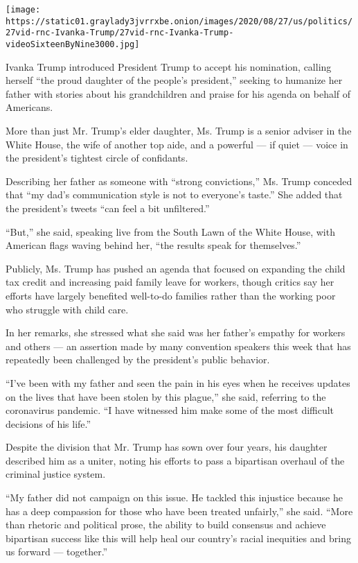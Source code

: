 \texttt{[image: https://static01.graylady3jvrrxbe.onion/images/2020/08/27/us/politics/27vid-rnc-Ivanka-Trump/27vid-rnc-Ivanka-Trump-videoSixteenByNine3000.jpg]}

Ivanka Trump introduced President Trump to accept his nomination,
calling herself ``the proud daughter of the people's president,''
seeking to humanize her father with stories about his grandchildren and
praise for his agenda on behalf of Americans.

More than just Mr. Trump's elder daughter, Ms. Trump is a senior adviser
in the White House, the wife of another top aide, and a powerful --- if
quiet --- voice in the president's tightest circle of confidants.

Describing her father as someone with ``strong convictions,'' Ms. Trump
conceded that ``my dad's communication style is not to everyone's
taste.'' She added that the president's tweets ``can feel a bit
unfiltered.''

``But,'' she said, speaking live from the South Lawn of the White House,
with American flags waving behind her, ``the results speak for
themselves.''

Publicly, Ms. Trump has pushed an agenda that focused on expanding the
child tax credit and increasing paid family leave for workers, though
critics say her efforts have largely benefited well-to-do families
rather than the working poor who struggle with child care.

In her remarks, she stressed what she said was her father's empathy for
workers and others --- an assertion made by many convention speakers
this week that has repeatedly been challenged by the president's public
behavior.

``I've been with my father and seen the pain in his eyes when he
receives updates on the lives that have been stolen by this plague,''
she said, referring to the coronavirus pandemic. ``I have witnessed him
make some of the most difficult decisions of his life.''

Despite the division that Mr. Trump has sown over four years, his
daughter described him as a uniter, noting his efforts to pass a
bipartisan overhaul of the criminal justice system.

``My father did not campaign on this issue. He tackled this injustice
because he has a deep compassion for those who have been treated
unfairly,'' she said. ``More than rhetoric and political prose, the
ability to build consensus and achieve bipartisan success like this will
help heal our country's racial inequities and bring us forward ---
together.''

